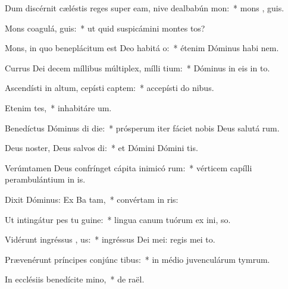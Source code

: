 \item Dum discérnit cæléstis reges super eam, nive dealbabún  mon:~* mons ,  guis.
\item Mons coagulá,  guis:~* ut quid suspicámini montes tos?
\item Mons, in quo beneplácitum est Deo habitá  o:~* étenim Dóminus habi  nem.
\item Currus Dei decem míllibus múltiplex, mílli tium:~* Dóminus in eis in   to.
\item Ascendísti in altum, cepísti captem:~* accepísti do  nibus.
\item Etenim  tes,~* inhabitáre  um.
\item Benedíctus Dóminus di die:~* prósperum iter fáciet nobis Deus salutá rum.
\item Deus noster, Deus salvos di:~* et Dómini Dómini  tis.
\item Verúmtamen Deus confrínget cápita inimicó rum:~* vérticem capílli perambulántium in  is.
\item Dixit Dóminus: Ex Ba tam,~* convértam in  ris:
\item Ut intingátur pes tu  guine:~* lingua canum tuórum ex ini,  so.
\item Vidérunt ingréssus , us:~* ingréssus Dei mei: regis mei    to.
\item Prævenérunt príncipes conjúnc tibus:~* in médio juvenculárum tymrum.
\item In ecclésiis benedícite  mino,~* de  raël.
